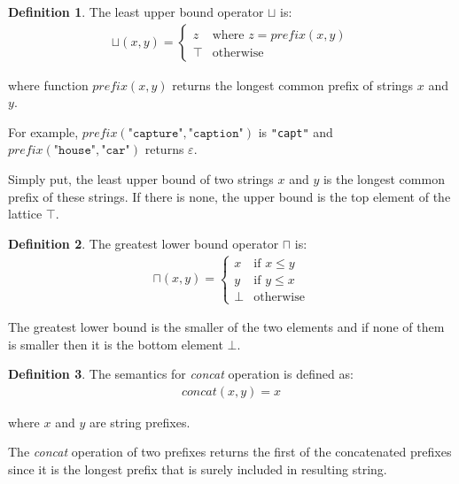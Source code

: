 \documentclass[12pt,final,oneside]{fithesis2}
\theoremstyle{definition}
\newtheorem{definition}{Definition}[chapter]
\begin{document}
\begin{definition}
\label{def:prefixjoin}
The least upper bound operator $\sqcup$ is:
\begin{align*}
\sqcup (x, y) =
\begin{cases}
z & \text{where } z
  = \textit{prefix}(x, y) \\
\top       & \text{otherwise}
\end{cases}
\end{align*}

where function $\textit{prefix}(x, y)$ returns the longest common prefix of
strings $x$ and $y$.
\end{definition}

For example, $\textit{prefix}(\texttt{"capture"}, \texttt{"caption"})$ is
\texttt{"capt"} and $\textit{prefix}(\texttt{"house"}, \texttt{"car"})$
returns $\varepsilon$.

Simply put, the least upper bound of two strings $x$ and $y$
is the longest common prefix of these strings. If there is
none, the upper bound is the top element of the lattice $\top$.

\begin{definition}
\label{def:prefixmeet}
The greatest lower bound operator $\sqcap$ is:
\begin{align*}
\sqcap (x, y) =
\begin{cases}
x    & \text{if } x \leq y \\
y    & \text{if } y \leq x \\
\bot & \text{otherwise}
\end{cases}
\end{align*}
\end{definition}

The greatest lower bound is the smaller of the two elements and if none
of them is smaller then it is the bottom element $\bot$.

\begin{definition}
\label{def:prefixstrcat}
The semantics for \textit{concat} operation is defined as:
\begin{align*}
\textit{concat}(x, y) = x
\end{align*}

where $x$ and $y$ are string prefixes.
\end{definition}

The \textit{concat} operation of two
prefixes returns the first of the concatenated prefixes since it is the
longest prefix that is surely included in resulting string.
\end{document}
